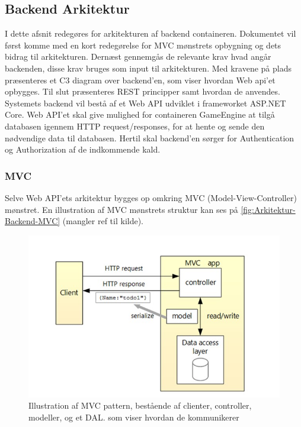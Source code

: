 \subsection{Backend Arkitektur}

I dette afsnit redegøres for arkitekturen af backend containeren. Dokumentet vil først komme med en kort redegørelse for MVC mønstrets opbygning og dets bidrag til arkitekturen. Dernæst gennemgås de relevante krav hvad angår backenden, disse krav bruges som input til arkitekturen. Med kravene på plads præsenteres et C3 diagram over backend’en, som viser hvordan Web api’et opbygges. Til slut præsenteres REST principper samt hvordan de anvendes.
Systemets backend vil bestå af et Web API udviklet i frameworket ASP.NET Core. Web API’et skal give mulighed for containeren GameEngine at tilgå databasen igennem HTTP request/responses, for at hente og sende den nødvendige data til databasen. Hertil skal backend’en sørger for Authentication og Authorization af de indkommende kald.\\

\subsubsection{MVC}
Selve Web API’ets arkitektur bygges op omkring MVC (Model-View-Controller) mønstret. En illustration af MVC mønstrets struktur kan ses på \autoref{fig:Arkitektur-Backend-MVC} (mangler ref til kilde).

\begin{figure}[H]
\centering
\includegraphics[width = \textwidth]{02-Body/Images/MVC_pattern.JPG}
\caption{Illustration af MVC pattern, bestående af clienter, controller, modeller, og et DAL. som viser hvordan de kommunikerer}
\label{fig:Arkitektur-Backend-MVC}
\end{figure}

